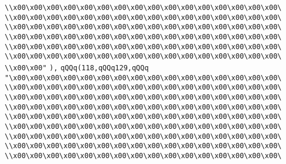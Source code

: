 \verb|\\x00\x00\x00\x00\x00\x00\x00\x00\x00\x00\x00\x00\x00\x00\x00\x00\|\newline
\verb|\\x00\x00\x00\x00\x00\x00\x00\x00\x00\x00\x00\x00\x00\x00\x00\x00\|\newline
\verb|\\x00\x00\x00\x00\x00\x00\x00\x00\x00\x00\x00\x00\x00\x00\x00\x00\|\newline
\verb|\\x00\x00\x00\x00\x00\x00\x00\x00\x00\x00\x00\x00\x00\x00\x00\x00\|\newline
\verb|\\x00\x00\x00\x00\x00\x00\x00\x00\x00\x00\x00\x00\x00\x00\x00\x00\|\newline
\verb|\\x00\x00\x00\x00\x00\x00\x00\x00\x00\x00\x00\x00\x00\x00\x00\x00\|\newline
\verb|\\x00\x00"|\newline
\verb|),|\newline
\verb|qQQq(118,qQQq129,qQQq|\newline
\verb|"\x00\x00\x00\x00\x00\x00\x00\x00\x00\x00\x00\x00\x00\x00\x00\x00\|\newline
\verb|\\x00\x00\x00\x00\x00\x00\x00\x00\x00\x00\x00\x00\x00\x00\x00\x00\|\newline
\verb|\\x00\x00\x00\x00\x00\x00\x00\x00\x00\x00\x00\x00\x00\x00\x00\x00\|\newline
\verb|\\x00\x00\x00\x00\x00\x00\x00\x00\x00\x00\x00\x00\x00\x00\x00\x00\|\newline
\verb|\\x00\x00\x00\x00\x00\x00\x00\x00\x00\x00\x00\x00\x00\x00\x00\x00\|\newline
\verb|\\x00\x00\x00\x00\x00\x00\x00\x00\x00\x00\x00\x00\x00\x00\x00\x00\|\newline
\verb|\\x00\x00\x00\x00\x00\x00\x00\x00\x00\x00\x00\x00\x00\x00\x00\x00\|\newline
\verb|\\x00\x00\x00\x00\x00\x00\x00\x00\x00\x00\x00\x00\x00\x00\x00\x00\|\newline
\verb|\\x00\x00\x00\x00\x00\x00\x00\x00\x00\x00\x00\x00\x00\x00\x00\x00\|\newline
